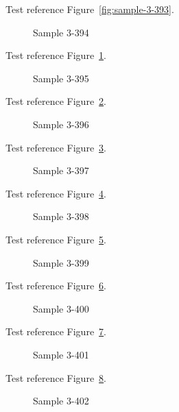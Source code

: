 Test reference Figure~\ref{fig:sample-3-393}.

\begin{figure}[tbhp]
\caption{Sample 3-394}
\label{fig:sample-3-394}
\end{figure}

Test reference Figure~\ref{fig:sample-3-394}.

\begin{figure}[tbhp]
\caption{Sample 3-395}
\label{fig:sample-3-395}
\end{figure}

Test reference Figure~\ref{fig:sample-3-395}.

\begin{figure}[tbhp]
\caption{Sample 3-396}
\label{fig:sample-3-396}
\end{figure}

Test reference Figure~\ref{fig:sample-3-396}.

\begin{figure}[tbhp]
\caption{Sample 3-397}
\label{fig:sample-3-397}
\end{figure}

Test reference Figure~\ref{fig:sample-3-397}.

\begin{figure}[tbhp]
\caption{Sample 3-398}
\label{fig:sample-3-398}
\end{figure}

Test reference Figure~\ref{fig:sample-3-398}.

\begin{figure}[tbhp]
\caption{Sample 3-399}
\label{fig:sample-3-399}
\end{figure}

Test reference Figure~\ref{fig:sample-3-399}.

\begin{figure}[tbhp]
\caption{Sample 3-400}
\label{fig:sample-3-400}
\end{figure}

Test reference Figure~\ref{fig:sample-3-400}.

\begin{figure}[tbhp]
\caption{Sample 3-401}
\label{fig:sample-3-401}
\end{figure}

Test reference Figure~\ref{fig:sample-3-401}.

\begin{figure}[tbhp]
\caption{Sample 3-402}
\label{fig:sample-3-402}
\end{figure}

